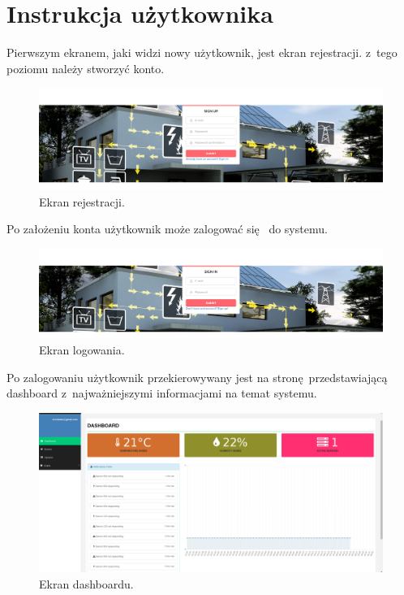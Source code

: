 \documentclass[eng,oneside]{mgr}
\begin{document}
\chapter{Instrukcja użytkownika} %
\label{cha:instrukcja_u_ytkownika}
Pierwszym ekranem, jaki widzi nowy użytkownik, jest ekran rejestracji. z~tego poziomu należy stworzyć konto.
\begin{figure}[h]
\centering
\includegraphics[width=\linewidth]{./register}
\caption{Ekran rejestracji.}
\label{fig:ekran_rejestracji}
\end{figure}

Po założeniu konta użytkownik może zalogować się  do systemu.
\begin{figure}[h]
\centering
\includegraphics[width=\linewidth]{./login}
\caption{Ekran logowania.}
\label{fig:ekran_logowania}
\end{figure}
\clearpage
Po zalogowaniu użytkownik przekierowywany jest na stronę przedstawiającą dashboard z~najważniejszymi informacjami na temat systemu.
\begin{figure}[h]
\centering
\includegraphics[width=\linewidth]{./dashboard}
\caption{Ekran dashboardu.}
\label{fig:ekran_dashboardu}
\end{figure}
\end{document}
